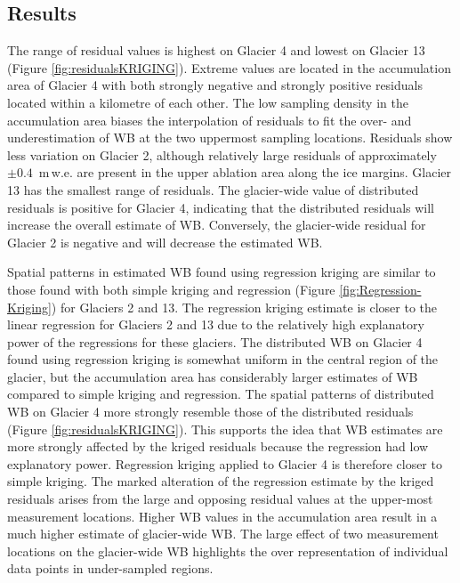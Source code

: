 \documentclass{sfuthesis}
\begin{document}
{\subsection{Results}

The range of residual values is highest on Glacier 4 and lowest on Glacier 13 (Figure \ref{fig:residualsKRIGING}). Extreme values are located in the accumulation area of Glacier 4 with both strongly negative and strongly positive residuals located within a kilometre of each other. The low sampling density in the accumulation area biases the interpolation of residuals to fit the over- and underestimation of WB at the two uppermost sampling locations. Residuals show less variation on Glacier 2, although relatively large residuals of approximately $\pm 0.4$ \,m\,w.e. are present in the upper ablation area along the ice margins. Glacier 13 has the smallest range of residuals. The glacier-wide value of distributed residuals is positive for Glacier 4, indicating that the distributed residuals will increase the overall estimate of WB. Conversely, the glacier-wide residual for Glacier 2 is negative and will decrease the estimated WB. 

Spatial patterns in estimated WB found using regression kriging are similar to those found with both simple kriging and regression (Figure \ref{fig:Regression-Kriging}) for Glaciers 2 and 13. The regression kriging estimate is closer to the linear regression for Glaciers 2 and 13 due to the relatively high explanatory power of the regressions for these glaciers. The distributed WB on Glacier 4 found using regression kriging is somewhat uniform in the central region of the glacier, but the accumulation area has considerably larger estimates of WB compared to simple kriging and regression. The spatial patterns of distributed WB on Glacier 4 more strongly resemble those of the distributed residuals (Figure \ref{fig:residualsKRIGING}). This supports the idea that WB estimates are more strongly affected by the kriged residuals because the regression had low explanatory power. Regression kriging applied to Glacier 4 is therefore closer to simple kriging. The marked alteration of the regression estimate by the kriged residuals arises from the large and opposing residual values at the upper-most measurement locations. Higher WB values in the accumulation area result in a much higher estimate of glacier-wide WB. The large effect of two measurement locations on the glacier-wide WB highlights the over representation of individual data points in under-sampled regions.

}
\end{document}
